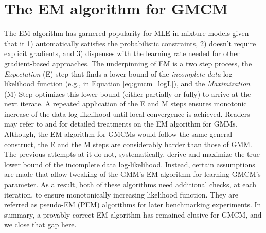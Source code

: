 \documentclass{article}
\theoremstyle{plain}
\theoremstyle{definition}
\theoremstyle{remark}
\begin{document}
\section{The EM algorithm for GMCM}\label{sec:EM}
The EM algorithm has garnered popularity for MLE in mixture models given that it 1) automatically satisfies the probabilistic constraints, 2) doesn't require explicit gradients, and 3) dispenses with the learning rate needed for other gradient-based approaches. The underpinning of EM is a two step process, the \emph{Expectation} (E)-step that finds a lower bound of the \emph{incomplete data} log-likelihood function (e.g., in Equation \eqref{eq:gmcm_logL}), and the \emph{Maximization} (M)-Step optimizes this lower bound (either partially or fully) to arrive at the next iterate. A repeated application of the E and M steps ensures monotonic increase of the data log-likelihood until local convergence is achieved. Readers may refer to \citet{Bilmes98agentle} and \citet{Salakhutdinov2002} for detailed treatments on the EM algorithm for GMMs. Although, the EM algorithm for GMCMs would follow the same general construct, the E and the M steps are considerably harder than those of GMM. The previous attempts at it \citep{Tewari2011, Bhattacharya2014} do not, systematically, derive and maximize the true lower bound of the incomplete data log-likelihood. Instead, certain assumptions are made that allow tweaking of the GMM's EM algorithm for learning GMCM's parameter. As a result, both of these algorithms need additional checks, at each iteration, to ensure monotonically increasing likelihood function. They are referred as pseudo-EM (PEM) algorithms for later benchmarking experiments. In summary, a provably correct EM algorithm has remained elusive for GMCM, and we close that gap here.
\end{document}
